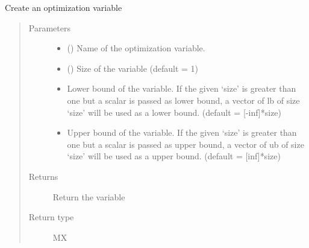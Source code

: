 \documentclass[letterpaper,10pt,english]{sphinxmanual}
\begin{document}
\begin{fulllineitems}

\begin{fulllineitems}
\label{\detokenize{yaocptool.optimization:yaocptool.optimization.abstract_optimization_problem.AbstractOptimizationProblem.create_variable}}
Create an optimization variable
\begin{quote}\begin{description}
\item[{Parameters}] \leavevmode\begin{itemize}
\item {} 
 () \textendash{} Name of the optimization variable.

\item {} 
 () \textendash{} Size of the variable (default = 1)

\item {} 
 \textendash{} Lower bound of the variable. If the given ‘size’ is greater than one but a scalar is passed as lower
bound, a vector of lb of size ‘size’ will be used as a lower bound. (default = {[}-inf{]}*size)

\item {} 
 \textendash{} Upper bound of the variable. If the given ‘size’ is greater than one but a scalar is passed as upper
bound, a vector of ub of size ‘size’ will be used as a upper bound. (default = {[}inf{]}*size)

\end{itemize}

\item[{Returns}] \leavevmode
Return the variable

\item[{Return type}] \leavevmode
MX

\end{description}\end{quote}

\end{fulllineitems}



\end{fulllineitems}
\end{document}

